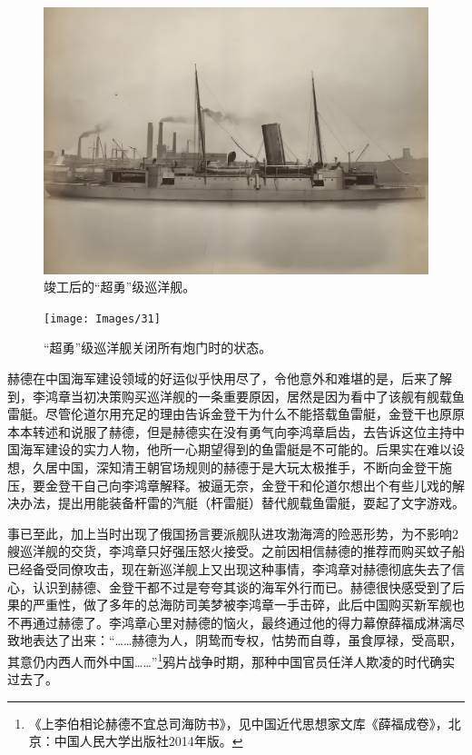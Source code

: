 \documentclass[12pt,UTF8]{ctexbook}
\begin{document}
\begin{figure}[htbp]
	\centering
	\includegraphics[width=1\linewidth]{Images/30}
	\caption{竣工后的“超勇”级巡洋舰。}
	\label{fig:1}
\end{figure}

\begin{figure}[htbp]
	\centering
	\texttt{[image: Images/31]}
	\caption{“超勇”级巡洋舰关闭所有炮门时的状态。}
	\label{fig:1}
\end{figure}

赫德在中国海军建设领域的好运似乎快用尽了，令他意外和难堪的是，后来了解到，李鸿章当初决策购买巡洋舰的一条重要原因，居然是因为看中了该舰有舰载鱼雷艇。尽管伦道尔用充足的理由告诉金登干为什么不能搭载鱼雷艇，金登干也原原本本转述和说服了赫德，但是赫德实在没有勇气向李鸿章启齿，去告诉这位主持中国海军建设的实力人物，他所一心期望得到的鱼雷艇是不可能的。后果实在难以设想，久居中国，深知清王朝官场规则的赫德于是大玩太极推手，不断向金登干施压，要金登干自己向李鸿章解释。被逼无奈，金登干和伦道尔想出个有些儿戏的解决办法，提出用能装备杆雷的汽艇（杆雷艇）替代舰载鱼雷艇，耍起了文字游戏。

事已至此，加上当时出现了俄国扬言要派舰队进攻渤海湾的险恶形势，为不影响2艘巡洋舰的交货，李鸿章只好强压怒火接受。之前因相信赫德的推荐而购买蚊子船已经备受同僚攻击，现在新巡洋舰上又出现这种事情，李鸿章对赫德彻底失去了信心，认识到赫德、金登干都不过是夸夸其谈的海军外行而已。赫德很快感受到了后果的严重性，做了多年的总海防司美梦被李鸿章一手击碎，此后中国购买新军舰也不再通过赫德了。李鸿章心里对赫德的恼火，最终通过他的得力幕僚薛福成淋漓尽致地表达了出来：“……赫德为人，阴鸷而专权，怙势而自尊，虽食厚禄，受高职，其意仍内西人而外中国……”\footnote{《上李伯相论赫德不宜总司海防书》，见中国近代思想家文库《薛福成卷》，北京：中国人民大学出版社2014年版。}鸦片战争时期，那种中国官员任洋人欺凌的时代确实过去了。
\end{document}
